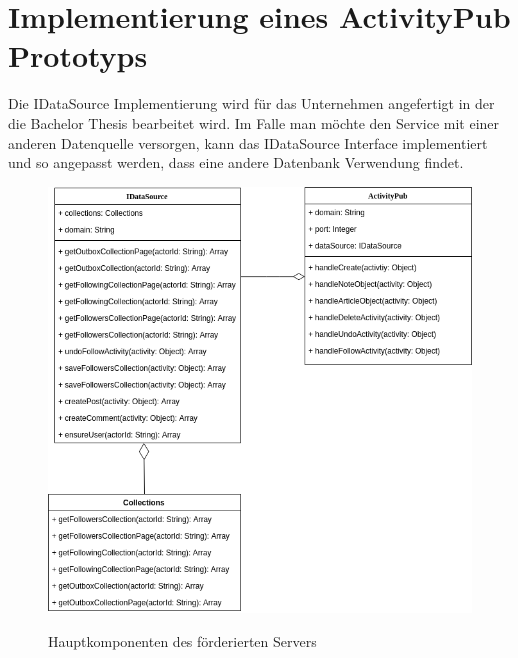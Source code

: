 
\chapter{Implementierung eines ActivityPub Prototyps}
Die IDataSource Implementierung wird für das Unternehmen angefertigt in der die Bachelor Thesis bearbeitet wird. Im Falle man möchte den Service mit einer anderen Datenquelle versorgen, kann das IDataSource Interface implementiert und so angepasst werden, dass eine andere Datenbank Verwendung findet.\\
\begin{figure}[h]
	\begin{minipage}{\textwidth}
		\centering
		\includegraphics[scale=0.6]{figures/klassendiagramm-activitypub.png}
		\label{klassendiagramm-activitypub}
		\caption{Hauptkomponenten des förderierten Servers}
	\end{minipage}
\end{figure}
